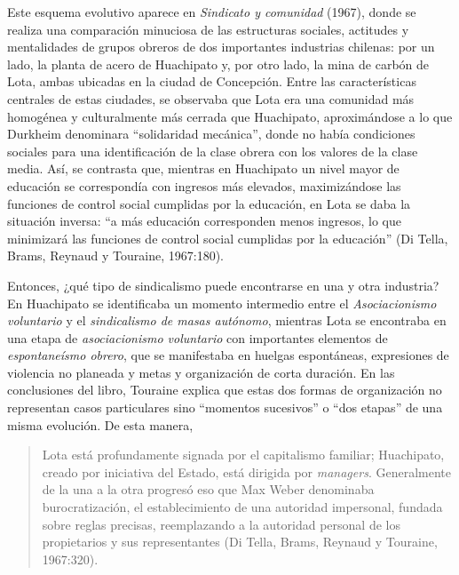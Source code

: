Este esquema evolutivo aparece en \emph{Sindicato y comunidad} (1967), donde se realiza una comparación minuciosa de las estructuras sociales, actitudes y mentalidades de grupos obreros de dos importantes industrias chilenas: por un lado, la planta de acero de Huachipato y, por otro lado, la mina de carbón de Lota, ambas ubicadas en la ciudad de Concepción. Entre las características centrales de estas ciudades, se observaba que Lota era una comunidad más homogénea y culturalmente más cerrada que Huachipato, aproximándose a lo que Durkheim denominara \enquote{solidaridad mecánica}, donde no había condiciones sociales para una identificación de la clase obrera con los valores de la clase media. Así, se contrasta que, mientras en Huachipato un nivel mayor de educación se correspondía con ingresos más elevados, maximizándose las funciones de control social cumplidas por la educación, en Lota se daba la situación inversa: \enquote{a más educación corresponden menos ingresos, lo que minimizará las funciones de control social cumplidas por la educación} (Di Tella, Brams, Reynaud y Touraine, 1967:180).

Entonces, ¿qué tipo de sindicalismo puede encontrarse en una y otra industria? En Huachipato se identificaba un momento intermedio entre el \emph{Asociacionismo voluntario} y el \emph{sindicalismo de masas autónomo}, mientras Lota se encontraba en una etapa de \emph{asociacionismo voluntario} con importantes elementos de \emph{espontaneísmo obrero}, que se manifestaba en huelgas espontáneas, expresiones de violencia no planeada y metas y organización de corta duración. En las conclusiones del libro, Touraine explica que estas dos formas de organización no representan casos particulares sino \enquote{momentos sucesivos} o \enquote{dos etapas} de una misma evolución. De esta manera,

\begin{quote}
Lota está profundamente signada por el capitalismo familiar; Huachipato, creado por iniciativa del Estado, está dirigida por \emph{managers}. Generalmente de la una a la otra progresó eso que Max Weber denominaba burocratización, el establecimiento de una autoridad impersonal, fundada sobre reglas precisas, reemplazando a la autoridad personal de los propietarios y sus representantes (Di Tella, Brams, Reynaud y Touraine, 1967:320).
\end{quote}

